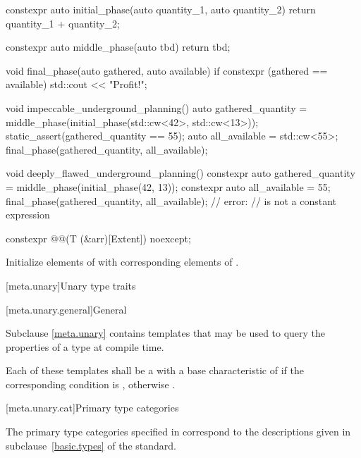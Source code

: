\pnum
\begin{example}
\begin{codeblock}
  constexpr auto initial_phase(auto quantity_1, auto quantity_2) {
    return quantity_1 + quantity_2;
  }

  constexpr auto middle_phase(auto tbd) {
    return tbd;
  }

  void final_phase(auto gathered, auto available) {
    if constexpr (gathered == available)
      std::cout << "Profit!\n";
  }

  void impeccable_underground_planning() {
    auto gathered_quantity = middle_phase(initial_phase(std::cw<42>, std::cw<13>));
    static_assert(gathered_quantity == 55);
    auto all_available = std::cw<55>;
    final_phase(gathered_quantity, all_available);
  }

  void deeply_flawed_underground_planning() {
    constexpr auto gathered_quantity = middle_phase(initial_phase(42, 13));
    constexpr auto all_available = 55;
    final_phase(gathered_quantity, all_available);  // error: 
                                                    // is not a constant expression
  }
\end{codeblock}
\end{example}

\begin{itemdecl}
constexpr @@(T (&arr)[Extent]) noexcept;
\end{itemdecl}

\begin{itemdescr}
\pnum
\effects
Initialize elements of  with corresponding elements of .
\end{itemdescr}

[meta.unary]{Unary type traits}

[meta.unary.general]{General}

\pnum
Subclause \ref{meta.unary} contains templates that may be used to query the
properties of a type at compile time.

\pnum
Each of these templates shall be a
with a base characteristic of
 if the corresponding condition is , otherwise
.

[meta.unary.cat]{Primary type categories}

\pnum
The primary type categories specified in 
correspond to the descriptions given in
subclause~\ref{basic.types} of the \Cpp{} standard.

